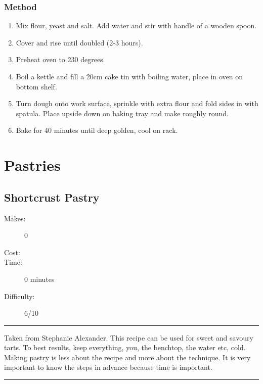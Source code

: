\documentclass[]{article}
\begin{document}
\subsubsection*{\Large Method}
\begin{enumerate}[font=\huge\color{accent}]
	\item Mix flour, yeast and salt. Add water and stir with handle of a wooden spoon.
	\item Cover and rise until doubled (2-3 hours).
	\item Preheat oven to 230 degrees.
	\item Boil a kettle and fill a 20cm cake tin with boiling water, place in oven on bottom shelf.
	\item Turn dough onto work surface, sprinkle with extra flour and fold sides in with spatula. Place upside down on baking tray and make roughly round.
	\item Bake for 40 minutes until deep golden, cool on rack.
\end{enumerate}
\newpage
{}
\section*{\center\Huge\color{accent}Pastries}
\label{cat:Pastries}
\label{rec:Shortcrust Pastry}
\subsection*{\center\huge Shortcrust Pastry}
\begin{description}
\item[Makes:] 0 
\item[Cost:] \textdollar
\item[Time:] 0 minutes
\item[Difficulty:] 6/10
\end{description}
\vspace{0.2cm}\hrule\vspace{0.5cm}
\begin{adjustwidth}{0.5 cm}{0.5 cm}

Taken from Stephanie Alexander. This recipe can be used for sweet and savoury tarts. To best results, keep everything, you, the benchtop, the water etc, cold. Making pastry is less about the recipe and more about the technique. It is very important to know the steps in advance because time is important. \hfill\color{accent}{\Large\faVimeoSquare\hspace{0.1cm}\faTruck\hspace{0.1cm}}\color{black}

\end{adjustwidth}
\vspace{0.5cm}\hrule
\end{document}
